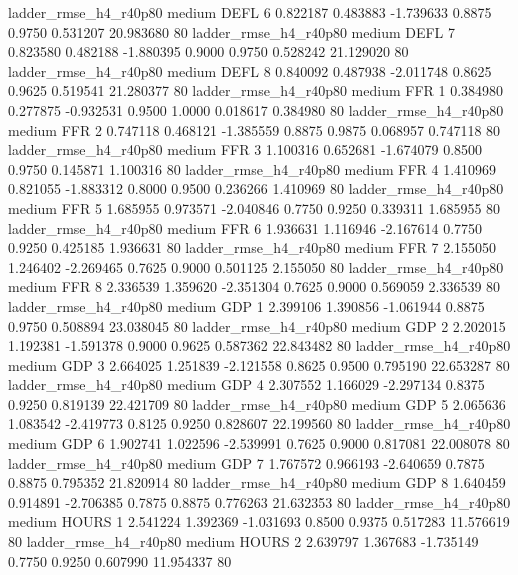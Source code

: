  ladder_rmse_h4_r40p80     medium     DEFL                 6  0.822187 0.483883 -1.739633 0.8875 0.9750  0.531207   20.983680 80
 ladder_rmse_h4_r40p80     medium     DEFL                 7  0.823580 0.482188 -1.880395 0.9000 0.9750  0.528242   21.129020 80
 ladder_rmse_h4_r40p80     medium     DEFL                 8  0.840092 0.487938 -2.011748 0.8625 0.9625  0.519541   21.280377 80
 ladder_rmse_h4_r40p80     medium      FFR                 1  0.384980 0.277875 -0.932531 0.9500 1.0000  0.018617    0.384980 80
 ladder_rmse_h4_r40p80     medium      FFR                 2  0.747118 0.468121 -1.385559 0.8875 0.9875  0.068957    0.747118 80
 ladder_rmse_h4_r40p80     medium      FFR                 3  1.100316 0.652681 -1.674079 0.8500 0.9750  0.145871    1.100316 80
 ladder_rmse_h4_r40p80     medium      FFR                 4  1.410969 0.821055 -1.883312 0.8000 0.9500  0.236266    1.410969 80
 ladder_rmse_h4_r40p80     medium      FFR                 5  1.685955 0.973571 -2.040846 0.7750 0.9250  0.339311    1.685955 80
 ladder_rmse_h4_r40p80     medium      FFR                 6  1.936631 1.116946 -2.167614 0.7750 0.9250  0.425185    1.936631 80
 ladder_rmse_h4_r40p80     medium      FFR                 7  2.155050 1.246402 -2.269465 0.7625 0.9000  0.501125    2.155050 80
 ladder_rmse_h4_r40p80     medium      FFR                 8  2.336539 1.359620 -2.351304 0.7625 0.9000  0.569059    2.336539 80
 ladder_rmse_h4_r40p80     medium      GDP                 1  2.399106 1.390856 -1.061944 0.8875 0.9750  0.508894   23.038045 80
 ladder_rmse_h4_r40p80     medium      GDP                 2  2.202015 1.192381 -1.591378 0.9000 0.9625  0.587362   22.843482 80
 ladder_rmse_h4_r40p80     medium      GDP                 3  2.664025 1.251839 -2.121558 0.8625 0.9500  0.795190   22.653287 80
 ladder_rmse_h4_r40p80     medium      GDP                 4  2.307552 1.166029 -2.297134 0.8375 0.9250  0.819139   22.421709 80
 ladder_rmse_h4_r40p80     medium      GDP                 5  2.065636 1.083542 -2.419773 0.8125 0.9250  0.828607   22.199560 80
 ladder_rmse_h4_r40p80     medium      GDP                 6  1.902741 1.022596 -2.539991 0.7625 0.9000  0.817081   22.008078 80
 ladder_rmse_h4_r40p80     medium      GDP                 7  1.767572 0.966193 -2.640659 0.7875 0.8875  0.795352   21.820914 80
 ladder_rmse_h4_r40p80     medium      GDP                 8  1.640459 0.914891 -2.706385 0.7875 0.8875  0.776263   21.632353 80
 ladder_rmse_h4_r40p80     medium    HOURS                 1  2.541224 1.392369 -1.031693 0.8500 0.9375  0.517283   11.576619 80
 ladder_rmse_h4_r40p80     medium    HOURS                 2  2.639797 1.367683 -1.735149 0.7750 0.9250  0.607990   11.954337 80
